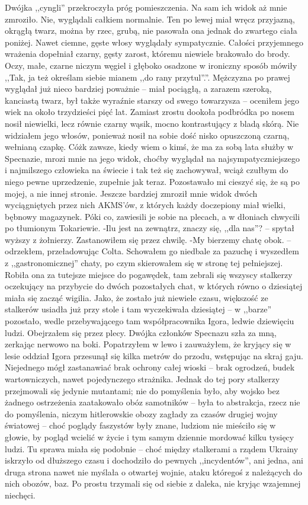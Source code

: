 \documentclass[../MAIN.tex]{subfiles}
\begin{document}
Dwójka ,,cyngli'' przekroczyła próg pomieszczenia. Na sam ich widok aż mnie zmroziło.
Nie, wyglądali całkiem normalnie. Ten po lewej miał wręcz przyjazną, okrągłą twarz, można by rzec, grubą, nie pasowała ona jednak do zwartego ciała poniżej. Nawet ciemne, gęste włosy wyglądały sympatycznie. Całości przyjemnego wrażenia dopełniał czarny, gęsty zarost, któremu niewiele brakowało do brody. Oczy, małe, czarne niczym węgiel i głęboko osadzone w ironiczny sposób mówiły ,,Tak, ja też określam siebie mianem ,,do rany przytul''.''.
Mężczyzna po prawej wyglądał już nieco bardziej poważnie -- miał pociągłą, a zarazem szeroką, kanciastą twarz, był także wyraźnie starszy od swego towarzysza -- oceniłem jego wiek na około trzydzieści pięć lat. Zamiast zrostu dookoła podbródka po nosem nosił niewielki, lecz równie czarny wąsik, mocno kontrastujący z bladą skórą. Nie widziałem jego włosów, ponieważ nosił na sobie dość nisko opuszczoną czarną, wełnianą czapkę.
Cóż\3k zawsze, kiedy wiem o kimś, że ma za sobą lata służby w Specnazie, mrozi mnie na jego widok, choćby wyglądał na najsympatyczniejszego i najmilszego człowieka na świecie i tak też się zachowywał, wciąż czułbym do niego pewne uprzedzenie, zupełnie jak teraz. Pozostawało mi cieszyć się, że są po mojej, a nie innej stronie.
Jeszcze bardziej zmroził mnie widok dwóch wyciągniętych przez nich AKMS’ów, z których każdy doczepiony miał wielki, bębnowy magazynek. Póki co, zawiesili je sobie na plecach, a w dłoniach chwycili po tłumionym Tokariewie.
-Ilu jest na zewnątrz, znaczy się, ,,dla nas''? -- spytał wyższy z żołnierzy.
Zastanowiłem się przez chwilę.
-My bierzemy chatę obok. -- odrzekłem, przeładowując Colta. Schowałem go niedbale za pazuchę i wyszedłem z ,,gastronomicznej'' chaty, po czym skierowałem się w stronę tej pełniejszej. Robiła ona za tutejsze miejsce do pogawędek, tam zebrali się wszyscy stalkerzy oczekujący na przybycie do dwóch pozostałych chat, w których równo o dziesiątej miała się zacząć wigilia. Jako, że zostało już niewiele czasu, większość ze stalkerów usiadła już przy stole i tam wyczekiwała dziesiątej -- w ,,barze'' pozostało, wedle przebywającego tam współpracownika Igora, ledwie dziewięciu ludzi.
Obejrzałem się przez plecy. Dwójka członków Specnazu szła za mną, zerkając nerwowo na boki. Popatrzyłem w lewo i zauważyłem, że kryjący się w lesie oddział Igora przesunął się kilka metrów do przodu, wstępując na skraj gaju.
Niejednego mógł zastanawiać brak ochrony całej wioski -- brak ogrodzeń, budek wartowniczych, nawet pojedynczego strażnika. Jednak do tej pory stalkerzy przejmowali się jedynie mutantami; nie do pomyślenia było, aby wojsko bez żadnego ostrzeżenia zaatakowało obóz samotników -- była to abstrakcja, rzecz nie do pomyślenia, niczym hitlerowskie obozy zagłady za czasów drugiej wojny światowej -- choć poglądy faszystów były znane, ludziom nie mieściło się w głowie, by pogląd wcielić w życie i tym samym dziennie mordować kilku tysięcy ludzi. Tu sprawa miała się podobnie -- choć między stalkerami a rządem Ukrainy iskrzyło od dłuższego czasu i dochodziło do pewnych ,,incydentów'', ani jedna, ani druga strona nawet nie myślała o otwartej wojnie, ataku któregoś z należących do nich obozów, baz. Po prostu trzymali się od siebie z daleka, nie kryjąc wzajemnej niechęci.
\end{document}
